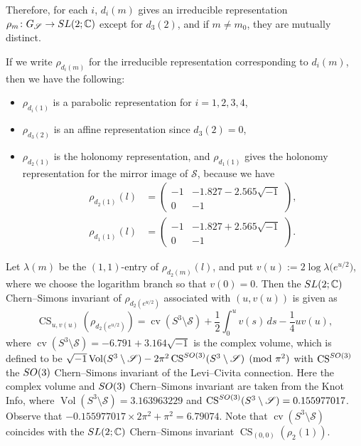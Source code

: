 \documentclass[a4paper,dvipdfmx]{amsart}
\theoremstyle{plain}
\theoremstyle{definition}
\theoremstyle{remark}
\newcommand{\C}{\mathbb{C}}
\newcommand{\Vol}{\operatorname{Vol}}
\newcommand{\CS}{\operatorname{CS}}
\newcommand{\cv}{\operatorname{cv}}
\newcommand{\SL}{\rm{SL}}
\newcommand{\St}{\mathscr{S}}
\renewcommand{\i}{\sqrt{-1}}
\numberwithin{equation}{section}
\begin{document}
Therefore, for each $i$, $d_i(m)$ gives an irreducible representation $\rho_m\colon G_{\St}\to\SL(2;\C)$ except for $d_3(2)$, and if $m\ne m_0$, they are mutually distinct.
\par
If we write $\rho_{d_i(m)}$ for the irreducible representation corresponding to $d_i(m)$, then we have the following:
\begin{itemize}
\item
$\rho_{d_i(1)}$ is a parabolic representation for $i=1,2,3,4$,
\item
$\rho_{d_3(2)}$ is an affine representation since $d_3(2)=0$,
\item
$\rho_{d_2(1)}$ is the holonomy representation, and $\rho_{d_1(1)}$ gives the holonomy representation for the mirror image of $\St$, because we have
\begin{align*}
  \rho_{d_2(1)}(l)
  &=
  \begin{pmatrix}
    -1&-1.827-2.565\i \\
     0&-1
  \end{pmatrix},
  \\
  \rho_{d_1(1)}(l)
  &=
  \begin{pmatrix}
    -1&-1.827+2.565\i \\
     0&-1
  \end{pmatrix}.
\end{align*}
\end{itemize}
\par
Let $\lambda(m)$ be the $(1,1)$-entry of $\rho_{d_2(m)}(l)$, and put $v(u):=2\log\lambda\bigl(e^{u/2}\bigr)$, where we choose the logarithm branch so that $v(0)=0$.
Then the $\SL(2;\C)$ Chern--Simons invariant of $\rho_{d_2(e^{u/2})}$ associated with $(u,v(u))$ is given as
\begin{equation*}
  \CS_{u,v(u)}(\rho_{d_2(e^{u/2})})
  =
  \cv(S^3\setminus\St)
  +
  \frac{1}{2}\int_{0}^{u}v(s)\,ds
  -
  \frac{1}{4}uv(u),
\end{equation*}
where $\cv(S^3\setminus\St)=-6.791 + 3.164\i$ is the complex volume, which is defined to be $\i\Vol(S^3\setminus\St)-2\pi^2\CS^{\rm{SO}(3)}(S^3\setminus\St)\pmod{\pi^2}$ with $\CS^{\rm{SO}(3)}$ the $\rm{SO}(3)$ Chern--Simons invariant of the Levi--Civita connection.
Here the complex volume and $\rm{SO}(3)$ Chern--Simons invariant are taken from the Knot Info, where $\Vol(S^3\setminus\St)=3.163963229$ and $\CS^{\rm{SO}(3)}(S^3\setminus\St)=0.155977017$.
Observe that $-0.155977017\times2\pi^2+\pi^2=6.79074$.
Note that $\cv(S^3\setminus\St)$ coincides with the $\SL(2;\C)$ Chern--Simons invariant $\CS_{(0,0)}(\rho_{2}(1))$.
\end{document}
